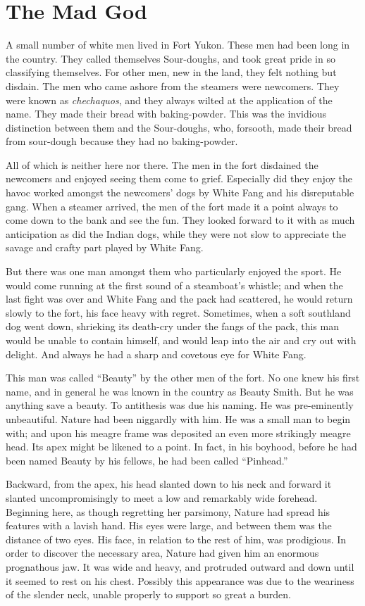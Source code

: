 \documentclass[10pt]{book}
\begin{document}
\chapter{The Mad God}

A small number of white men lived in Fort Yukon. These men had been
long in the country. They called themselves Sour-doughs, and took great
pride in so classifying themselves. For other men, new in the land,
they felt nothing but disdain. The men who came ashore from the
steamers were newcomers. They were known as \emph{chechaquos}, and they
always wilted at the application of the name. They made their bread
with baking-powder. This was the invidious distinction between them and
the Sour-doughs, who, forsooth, made their bread from sour-dough
because they had no baking-powder.

All of which is neither here nor there. The men in the fort disdained
the newcomers and enjoyed seeing them come to grief. Especially did
they enjoy the havoc worked amongst the newcomers’ dogs by White Fang
and his disreputable gang. When a steamer arrived, the men of the fort
made it a point always to come down to the bank and see the fun. They
looked forward to it with as much anticipation as did the Indian dogs,
while they were not slow to appreciate the savage and crafty part
played by White Fang.

But there was one man amongst them who particularly enjoyed the sport.
He would come running at the first sound of a steamboat’s whistle; and
when the last fight was over and White Fang and the pack had scattered,
he would return slowly to the fort, his face heavy with regret.
Sometimes, when a soft southland dog went down, shrieking its death-cry
under the fangs of the pack, this man would be unable to contain
himself, and would leap into the air and cry out with delight. And
always he had a sharp and covetous eye for White Fang.

This man was called “Beauty” by the other men of the fort. No one knew
his first name, and in general he was known in the country as Beauty
Smith. But he was anything save a beauty. To antithesis was due his
naming. He was pre-eminently unbeautiful. Nature had been niggardly
with him. He was a small man to begin with; and upon his meagre frame
was deposited an even more strikingly meagre head. Its apex might be
likened to a point. In fact, in his boyhood, before he had been named
Beauty by his fellows, he had been called “Pinhead.”

Backward, from the apex, his head slanted down to his neck and forward
it slanted uncompromisingly to meet a low and remarkably wide forehead.
Beginning here, as though regretting her parsimony, Nature had spread
his features with a lavish hand. His eyes were large, and between them
was the distance of two eyes. His face, in relation to the rest of him,
was prodigious. In order to discover the necessary area, Nature had
given him an enormous prognathous jaw. It was wide and heavy, and
protruded outward and down until it seemed to rest on his chest.
Possibly this appearance was due to the weariness of the slender neck,
unable properly to support so great a burden.
\end{document}
